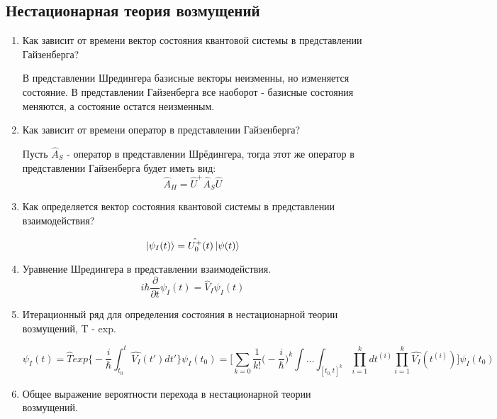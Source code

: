 \documentclass{article}
\begin{document}
\subsection*{Нестационарная теория возмущений}
\begin{enumerate}
	\item {Как зависит от времени вектор состояния квантовой системы в представлении Гайзенберга?}
	
	В представлении Шредингера базисные векторы неизменны, но изменяется
состояние. В представлении Гайзенберга все наоборот - базисные состояния
меняются, а состояние остатся неизменным.
	
	\item {Как зависит от времени оператор в представлении Гайзенберга?}
	
	Пусть $\hat{A}_S$ - оператор в представлении Шрёдингера, тогда этот же оператор в представлении Гайзенберга будет иметь вид:
	\begin{equation}
		\hat{A}_{H}=\hat{U}^{+}\hat{A}_{S}\hat{U}
	\end{equation}
	
	\item {Как определяется вектор состояния квантовой системы в представлении взаимодействия?}
	
	\begin{equation}
		\ket{\psi_{I}(t)}=\hat{U_{0}^{+}}(t)\ket{\psi(t)}
	\end{equation}
	
	\item {Уравнение Шредингера в представлении взаимодействия.}
	\begin{equation}
		i\hbar\frac{\partial}{\partial t}\psi_{I}(t)=\hat{V}_{I}\psi_{I}(t)
	\end{equation}
	
	\item {Итерационный ряд для определения состояния в нестационарной теории возмущений, T - exp.}
	
	\begin{equation}
		\psi_{I}(t)=\hat{T}exp\big\{-\frac{i}{\hbar}\int_{t_{0}}^{t}\hat{V_{I}}(t')dt'\big\}\psi_{I}(t_{0})=\big[\sum_{k=0}\frac{1}{k!}\big(-\frac{i}{\hbar}\big)^{k}\int\dots \int_{[t_{0,}t]^{k}}\prod_{i=1}^{k}dt^{(i)}\prod_{i=1}^{k}\hat{V_{I}}(t^{(i)})\big]\psi_{I}(t_{0})
	\end{equation}
	
	\item {Общее выражение вероятности перехода в нестационарной теории возмущений.}
	

\end{enumerate}
\end{document}
